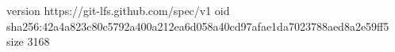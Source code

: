 version https://git-lfs.github.com/spec/v1
oid sha256:42a4a823c80c5792a400a212ea6d058a40cd97afae1da7023788aed8a2e59ff5
size 3168
